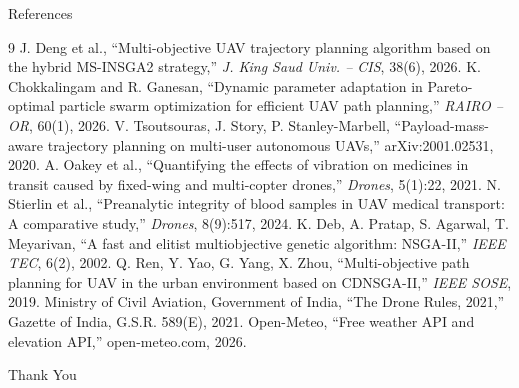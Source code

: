 \documentclass[aspectratio=169,11pt]{beamer}
\begin{document}
\begin{frame}{References}
  \scriptsize
  \begin{thebibliography}{9}
    \setlength{\itemsep}{0.6mm}
    \setlength{\parskip}{0pt}
      J. Deng et al.,
      ``Multi-objective UAV trajectory planning algorithm based on the hybrid MS-INSGA2 strategy,''
      \emph{J. King Saud Univ. -- CIS}, 38(6), 2026.
      K. Chokkalingam and R. Ganesan,
      ``Dynamic parameter adaptation in Pareto-optimal particle swarm optimization for efficient UAV path planning,''
      \emph{RAIRO -- OR}, 60(1), 2026.
      V. Tsoutsouras, J. Story, P. Stanley-Marbell,
      ``Payload-mass-aware trajectory planning on multi-user autonomous UAVs,''
      arXiv:2001.02531, 2020.
      A. Oakey et al.,
      ``Quantifying the effects of vibration on medicines in transit caused by fixed-wing and multi-copter drones,''
      \emph{Drones}, 5(1):22, 2021.
      N. Stierlin et al.,
      ``Preanalytic integrity of blood samples in UAV medical transport: A comparative study,''
      \emph{Drones}, 8(9):517, 2024.
      K. Deb, A. Pratap, S. Agarwal, T. Meyarivan,
      ``A fast and elitist multiobjective genetic algorithm: NSGA-II,''
      \emph{IEEE TEC}, 6(2), 2002.
      Q. Ren, Y. Yao, G. Yang, X. Zhou,
      ``Multi-objective path planning for UAV in the urban environment based on CDNSGA-II,''
      \emph{IEEE SOSE}, 2019.
      Ministry of Civil Aviation, Government of India,
      ``The Drone Rules, 2021,''
      Gazette of India, G.S.R. 589(E), 2021.
      Open-Meteo,
      ``Free weather API and elevation API,''
      open-meteo.com, 2026.
  \end{thebibliography}
\end{frame}

\begin{frame}[plain]
  \centering
  \vfill
  {\color{UniversityBlue}\Huge Thank You}\par
  
  \vfill
\end{frame}
\end{document}
